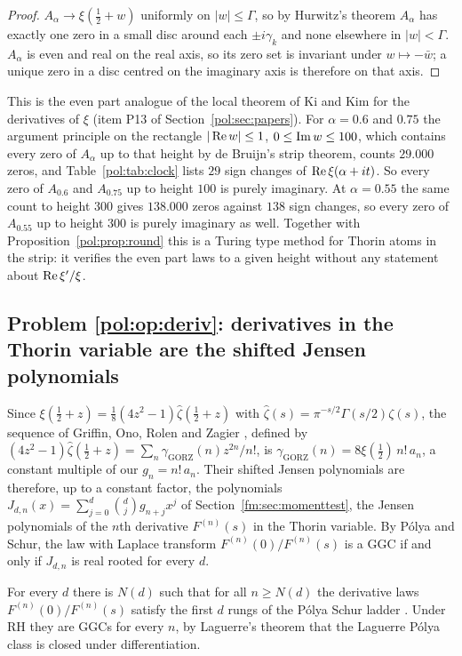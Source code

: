 \begin{proof}
$A_\alpha\to\xi(\frac12+w)$ uniformly on $|w|\le\Gamma$, so by Hurwitz's theorem $A_\alpha$ has exactly one zero in a small disc around each $\pm i\gamma_k$ and none elsewhere in $|w|<\Gamma$. $A_\alpha$ is even and real on the real axis, so its zero set is invariant under $w\mapsto-\bar w$; a unique zero in a disc centred on the imaginary axis is therefore on that axis.
\end{proof}

This is the even part analogue of the local theorem of Ki and Kim for the derivatives of $\xi$ (item P13 of Section~\ref{pol:sec:papers}). For $\alpha=0.6$ and $0.75$ the argument principle on the rectangle $|\operatorname{Re} w|\le1$, $0\le\operatorname{Im} w\le100$, which contains every zero of $A_\alpha$ up to that height by de Bruijn's strip theorem, counts $29.000$ zeros, and Table~\ref{pol:tab:clock} lists $29$ sign changes of $\operatorname{Re}\xi(\alpha+it)$. So every zero of $A_{0.6}$ and $A_{0.75}$ up to height $100$ is purely imaginary. At $\alpha=0.55$ the same count to height $300$ gives $138.000$ zeros against $138$ sign changes, so every zero of $A_{0.55}$ up to height $300$ is purely imaginary as well. Together with Proposition~\ref{pol:prop:round} this is a Turing type method for Thorin atoms in the strip: it verifies the even part laws to a given height without any statement about $\operatorname{Re}\xi'/\xi$.

\subsection{Problem \ref{pol:op:deriv}: derivatives in the Thorin variable are the shifted Jensen polynomials}

Since $\xi(\frac12+z)=\frac18(4z^2-1)\widehat\zeta(\frac12+z)$ with $\widehat\zeta(s)=\pi^{-s/2}\Gamma(s/2)\zeta(s)$, the sequence of Griffin, Ono, Rolen and Zagier \cite{GORZ19}, defined by $(4z^2-1)\widehat\zeta(\frac12+z)=\sum_n\gamma_{\mathrm{GORZ}}(n)z^{2n}/n!$, is $\gamma_{\mathrm{GORZ}}(n)=8\xi(\frac12)\,n!\,a_n$, a constant multiple of our $g_n=n!\,a_n$. Their shifted Jensen polynomials are therefore, up to a constant factor, the polynomials $J_{d,n}(x)=\sum_{j=0}^d\binom dj g_{n+j}x^j$ of Section~\ref{fm:sec:momenttest}, the Jensen polynomials of the $n$th derivative $F^{(n)}(s)$ in the Thorin variable. By P\'olya and Schur, the law with Laplace transform $F^{(n)}(0)/F^{(n)}(s)$ is a GGC if and only if $J_{d,n}$ is real rooted for every $d$.

\begin{corollary}
For every $d$ there is $N(d)$ such that for all $n\ge N(d)$ the derivative laws $F^{(n)}(0)/F^{(n)}(s)$ satisfy the first $d$ rungs of the P\'olya Schur ladder \cite{GORZ19}. Under RH they are GGCs for every $n$, by Laguerre's theorem that the Laguerre P\'olya class is closed under differentiation.
\end{corollary}

